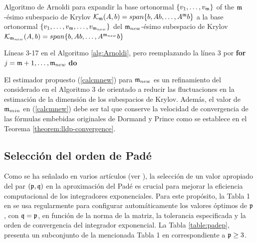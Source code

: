\begin{algorithm}[h!]
	\caption{Algoritmo de Arnoldi para expandir la base ortonormal $\{v_1,\ldots,v_{\mathfrak{m}} \}$ of the $\mathfrak{m}$-ésimo subespacio de Krylov $\mathcal{K}_{\mathfrak{m}}(A,b)=span\{b,Ab,\ldots,A^{\mathfrak{m}}b\}$ a la base ortonormal $\{v_1,\ldots,v_{\mathfrak{m}},\ldots,v_{\mathfrak{m}_{new}} \}$ del $\mathfrak{m}_{new}$-ésimo subespacio de Krylov ${\mathcal{K}_{\mathfrak{m}_{new}}(A,b)=span\{b,Ab,\ldots,A^{\mathfrak{m}_{new}}b\}}$}
    \label{alg:Arnoldiexpand}
	Líneas 3-17 en el Algoritmo \ref{alg:Arnoldi}, pero reemplazando la línea 3 por \textbf{for} $j=\mathfrak{m}+1,\ldots,\mathfrak{m}_{new}$ \textbf{do}
\end{algorithm}
El estimador propuesto (\ref{calcmnew}) para $\mathfrak{m}_{new}$ es un refinamiento del considerado en el Algoritmo 3 de \cite{niesen2012algorithm} orientado a reducir las fluctuaciones en la estimación de la dimensión de los subespacios de Krylov. Además, el valor de $\mathfrak{m}_{min}$ en (\ref{calcmnew}) debe ser tal que conserve la velocidad de convergencia de las fórmulas embebidas originales de Dormand y Prince como se establece en el Teorema \ref{theorem:lldp-convergence}.

\subsection{Selección del orden de Padé}\label{sec:pade-order}
Como se ha señalado en varios artículos (ver \cite{jimenez2009rate,jimenez2012convergence, Jimenez14AMC, jimenez2015convergence}), la selección de un valor apropiado del par $(\mathfrak{p},\mathfrak{q})$ en la aproximación del Padé es crucial para mejorar la eficiencia computacional de los integradores exponenciales. Para este propósito, la Tabla 1 en \cite{moler2003nineteen} se usa regularmente para configurar automáticamente los valores óptimos de $\mathfrak{p}$, con $\mathfrak{q}=\mathfrak{p}$, en función de la norma de la matriz, la tolerancia especificada y la orden de convergencia del integrador exponencial. La Tabla \ref{table:padep}, presenta un subconjunto de la mencionada Tabla 1 en \cite{moler2003nineteen} correspondiente a $\mathfrak{p} \ge 3$.

